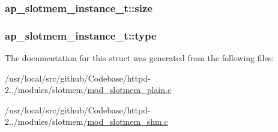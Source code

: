 \subsubsection[{\texorpdfstring{size}{size}}]{ ap\+\_\+slotmem\+\_\+instance\+\_\+t\+::size}\hypertarget{structap__slotmem__instance__t_a89d3f68dd1387df2870c651ec32dbe79}{}\label{structap__slotmem__instance__t_a89d3f68dd1387df2870c651ec32dbe79}
\subsubsection[{\texorpdfstring{type}{type}}]{ ap\+\_\+slotmem\+\_\+instance\+\_\+t\+::type}\hypertarget{structap__slotmem__instance__t_afddd8c3f90f0aa40cf23d616d9f8acc3}{}\label{structap__slotmem__instance__t_afddd8c3f90f0aa40cf23d616d9f8acc3}


The documentation for this struct was generated from the following files\+:\begin{DoxyCompactItemize}
\item 
/usr/local/src/github/\+Codebase/httpd-\/2../modules/slotmem/\hyperlink{mod__slotmem__plain_8c}{mod\+\_\+slotmem\+\_\+plain.\+c}\item 
/usr/local/src/github/\+Codebase/httpd-\/2../modules/slotmem/\hyperlink{mod__slotmem__shm_8c}{mod\+\_\+slotmem\+\_\+shm.\+c}\end{DoxyCompactItemize}

